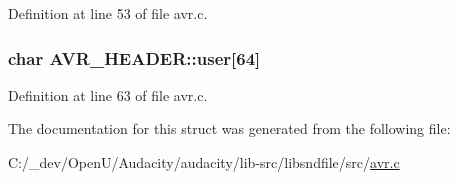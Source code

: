 Definition at line 53 of file avr.\+c.

\subsubsection[{\texorpdfstring{user}{user}}]{\setlength{\rightskip}{0pt plus 5cm}char A\+V\+R\+\_\+\+H\+E\+A\+D\+E\+R\+::user\mbox{[}64\mbox{]}}\hypertarget{struct_a_v_r___h_e_a_d_e_r_afb410cee307d39e940dabb00b945e3a8}{}\label{struct_a_v_r___h_e_a_d_e_r_afb410cee307d39e940dabb00b945e3a8}


Definition at line 63 of file avr.\+c.



The documentation for this struct was generated from the following file\+:\begin{DoxyCompactItemize}
\item 
C\+:/\+\_\+dev/\+Open\+U/\+Audacity/audacity/lib-\/src/libsndfile/src/\hyperlink{avr_8c}{avr.\+c}\end{DoxyCompactItemize}
